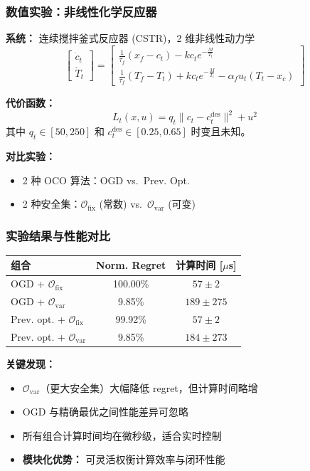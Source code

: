 \documentclass{ltx-talk}
\begin{document}
\begin{frame}
\frametitle{数值实验：非线性化学反应器}

\textbf{系统：} 连续搅拌釜式反应器 (CSTR)，2 维非线性动力学
\[
    \begin{bmatrix} \dot{c}_t \\ \dot{T}_t \end{bmatrix} = \begin{bmatrix}
        \frac{1}{\tau_f}(x_f - c_t) - k c_t e^{-\frac{M}{T_t}} \\[4pt]
        \frac{1}{\tau_f}(T_f - T_t) + k c_t e^{-\frac{M}{T_t}} - \alpha_f u_t(T_t - x_c)
    \end{bmatrix}
\]

\textbf{代价函数：}
\[
    L_t(x, u) = q_t\|c_t - c_t^{\text{des}}\|^2 + u^2
\]
其中 $q_t \in [50, 250]$ 和 $c_t^{\text{des}} \in [0.25, 0.65]$ 时变且未知。

\textbf{对比实验：}
\begin{itemize}
    \item 2 种 OCO 算法：OGD vs.\ Prev. Opt.
    \item 2 种安全集：$\mathcal{O}_{\text{fix}}$ (常数) vs.\ $\mathcal{O}_{\text{var}}$ (可变)
\end{itemize}
\end{frame}

\begin{frame}
\frametitle{实验结果与性能对比}

\begin{center}
\begin{tabular}{l|c|c}
\hline
\textbf{组合} & \textbf{Norm. Regret} & \textbf{计算时间 [$\mu$s]} \\
\hline
OGD + $\mathcal{O}_{\text{fix}}$ & 100.00\% & $57 \pm 2$ \\
OGD + $\mathcal{O}_{\text{var}}$ & 9.85\% & $189 \pm 275$ \\
Prev. opt. + $\mathcal{O}_{\text{fix}}$ & 99.92\% & $57 \pm 2$ \\
Prev. opt. + $\mathcal{O}_{\text{var}}$ & 9.85\% & $184 \pm 273$ \\
\hline
\end{tabular}
\end{center}

\textbf{关键发现：}
\begin{itemize}
    \item $\mathcal{O}_{\text{var}}$（更大安全集）大幅降低 regret，但计算时间略增
    \item OGD 与精确最优之间性能差异\textcolor{myred}{可忽略}
    \item 所有组合计算时间均在微秒级，\textcolor{myblue}{适合实时控制}
    \item \textbf{模块化优势：} 可灵活权衡计算效率与闭环性能
\end{itemize}
\end{frame}
\end{document}
